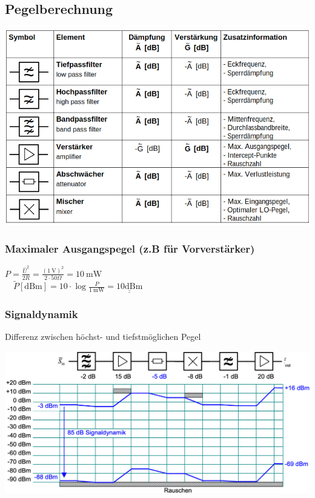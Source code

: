 \subsection{Pegelberechnung}
 \begin{center}
     \includegraphics[width=\linewidth]{graphic/signalparameter/pegelplan.png}
 \end{center}
 \vspace{-8pt}

\subsubsection{Maximaler Ausgangspegel (z.B für Vorverstärker)}
$P=\frac{\hat{U}^{2}}{2 R}=\frac{(1 \mathrm{~V})^{2}}{2 \cdot 50 \Omega}=10 \mathrm{~mW} $\\
$\quad \widetilde{P}[\mathrm{dBm}]=10 \cdot \log \frac{P}{1 \mathrm{~mW}}=\underline{\underline{10 \mathrm{dBm}}}$


\subsubsection{Signaldynamik}
Differenz zwischen höchst- und tiefstmöglichen Pegel
\vspace{-8pt}
\begin{center}
    \includegraphics[width=\linewidth]{graphic/signalparameter/uebung.png}
\end{center}
\vspace{-8pt}


